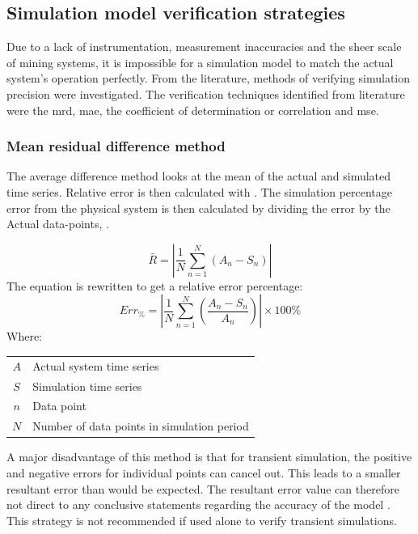  	\subsection{Simulation model verification strategies}\label{VerificationLit}
 	Due to a lack of instrumentation, measurement inaccuracies and the sheer scale of mining systems, it is impossible for a simulation model to match the actual system's operation perfectly. From the literature, methods of verifying simulation precision were investigated. The verification techniques identified from literature were the \gls{mrd}, \gls{mae},  the coefficient of determination or correlation and \gls{mse}.%
 		\subsubsection{Mean residual difference method}
 			The average difference method looks at the mean of the actual and simulated time series. Relative error is then calculated with . The simulation percentage error from the physical system is then calculated by dividing the error by the Actual data-points, .
 			
 			\begin{equation}
 			\label{eq: AMean absolute}
 			\bar{R} = \left| \dfrac{1}{N} \sum_{n=1}^{N}{ \left( A_{n} - S_{n}\right)} \right|
 			\end{equation}
The equation is rewritten to get a relative error percentage:	
 			\begin{equation}
 				\label{eq: Average difference}
 				Err_{\%} = \left| \dfrac{1}{N} \sum_{n=1}^{N}{ \left(\dfrac{ A_{n} - S_{n}}{A_n}\right)} \right| \times 100 \%
 			\end{equation}
 			Where: \par 
 				\begin{table}[!htbp]
 					\centering
 					\begin{tabular}{cl}
 						$A$ & Actual system time series \\
 						$S$ & Simulation time series \\
 						$n$ & Data point \\
 						$N$ & Number of data points in simulation period \\
 					\end{tabular} 
 				\end{table}	
 			A major disadvantage of this method is that for transient simulation, the positive and negative errors for individual points can cancel out. This leads to a smaller resultant error than would be expected. The resultant error value can therefore not direct to any conclusive statements regarding the accuracy of the model \cite{sarin2010comparing}. This strategy is not recommended if used alone to verify transient simulations. 
 			\par 
 						
